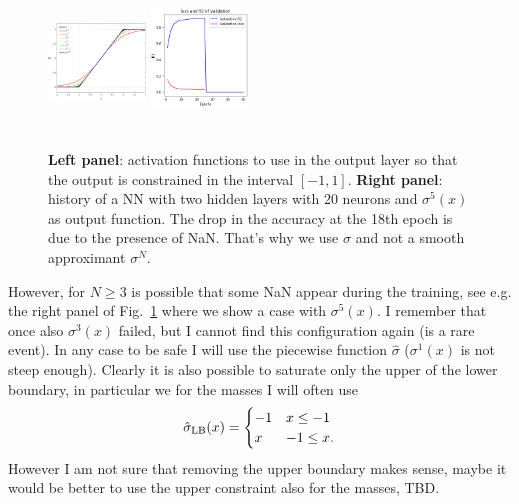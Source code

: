 \documentclass[prd,aps,twocolumn,a4paper,showkeys,nofootinbib]{article}
\begin{document}
\begin{figure}[t]
  \center
  \includegraphics[width=0.23\textwidth,height=3.7cm]{./Figs/out_activation_function.png}
  \includegraphics[width=0.23\textwidth,height=3.9cm]{./Figs/history_sigma5_layers20+20.png}
  \caption{\label{fig:out_act_f} \textbf{Left panel}: activation functions to use in the 
  output layer so that the output is constrained in the interval $[-1,1]$.
  \textbf{Right panel}: history of a NN with two hidden layers with 20 neurons 
  and $\sigma^5(x)$ as output function.
  The drop in the accuracy at the 18th epoch is due to the presence of NaN.
  That's why we use $\hat{\sigma}$ and not a smooth approximant $\sigma^N$.}
\end{figure}
%
However, for $N\geq 3$ is possible that some NaN appear during the training, see e.g. the right
panel of Fig.~\ref{fig:out_act_f} where we show a case with $\sigma^5(x)$. 
I remember that once also $\sigma^3(x)$ failed, but I 
cannot find this configuration again (is a rare event). 
In any case to be safe I will use the piecewise function $\hat{\sigma}$ ($\sigma^1(x)$ is 
not steep enough).
Clearly it is also possible to saturate only the upper of the lower boundary, in particular we 
for the masses I will often use
\begin{equation}
\hat{\sigma}_{\rm LB}(x) = \begin{cases} 
      -1 & x\leq -1 \\
      x & -1\leq x.
\end{cases}
\end{equation}
However I am not sure that removing the upper boundary makes sense, maybe it would 
be better to use the upper constraint also for the masses, TBD.
%
\end{document}

